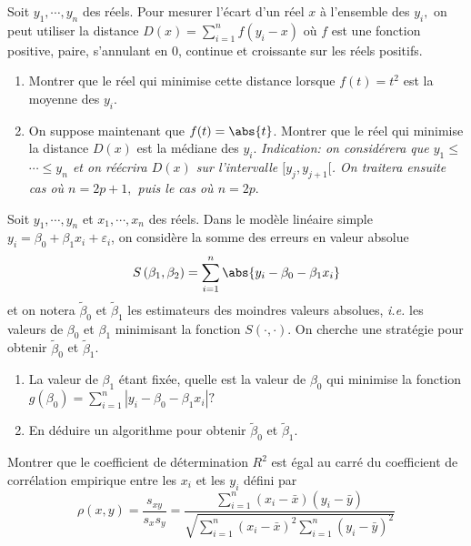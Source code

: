 \documentclass{td_um}
\providecommand{\1}{\mathds{1}}
\begin{document}
\cor{\newpage}

\exo{} 
Soit $y_{1}, \cdots, y_{n}$ des réels. Pour mesurer l'écart d'un réel $x$ à l'ensemble des $y_{i},$ on peut utiliser la distance $D(x)=\sum_{i=1}^{n} f\left(y_{i}-x\right)$ où $f$ est une fonction positive, paire, s'annulant en 0, continue et croissante sur les réels positifs.
\begin{enumerate}
    \item Montrer que le réel qui minimise cette distance lorsque $f(t)=t^{2}$ est la moyenne des $y_{i}$.
    \item On suppose maintenant que $f(t)=\abs{t}$. Montrer que le réel qui minimise la distance $D(x)$ est la médiane des $y_{i}$. {\it Indication: on considérera que $y_{1} \leq$ $\cdots \leq y_{n}$ et on réécrira $D(x)$ sur l'intervalle $[y_{j}, y_{j+1}[$. On traitera ensuite cas où $n=2 p+1,$ puis le cas où $n=2 p$}.

\end{enumerate}

\cor{\newpage}

\exo{} Soit $y_{1}, \cdots, y_{n}$ et $x_{1}, \cdots, x_{n}$ des réels. Dans le modèle linéaire simple $y_{i}=\beta_{0}+\beta_{1} x_{i}+\varepsilon_{i}$, on considère la somme des erreurs en valeur absolue
\[
    S\left(\beta_{1}, \beta_{2}\right)=\sum_{i=1}^{n}\abs{y_{i}-\beta_{0}-\beta_{1} x_{i}}
\]
et on notera $\tilde{\beta}_{0}$ et $\tilde{\beta}_{1}$ les estimateurs des moindres valeurs absolues, \textit{i.e.} les valeurs de $\beta_{0}$ et $\beta_{1}$ minimisant la fonction $S(\cdot, \cdot)$. On cherche une stratégie pour obtenir $\tilde{\beta}_{0}$ et $\tilde{\beta}_{1}$.
\begin{enumerate}
 \item La valeur de $\beta_{1}$ étant fixée, quelle est la valeur de $\beta_{0}$ qui minimise la fonction $g\left(\beta_{0}\right)=\sum_{i=1}^{n}\left|y_{i}-\beta_{0}-\beta_{1} x_{i}\right| ?$
 \item En déduire un algorithme pour obtenir $\tilde{\beta}_{0}$ et $\tilde{\beta}_{1}$.
\end{enumerate}


\cor{\newpage}

\exo{}
Montrer que le coefficient de détermination $R^{2}$ est égal au carré du coefficient de corrélation empirique entre les $x_{i}$ et les $y_{i}$ défini par
\[
\rho(x, y)=\frac{s_{x y}}{s_{x} s_{y}}=\frac{\sum_{i=1}^{n}\left(x_{i}-\bar{x}\right)\left(y_{i}-\bar{y}\right)}{\sqrt{\sum_{i=1}^{n}\left(x_{i}-\bar{x}\right)^{2} \sum_{i=1}^{n}\left(y_{i}-\bar{y}\right)^{2}}}
\]
\end{document}
